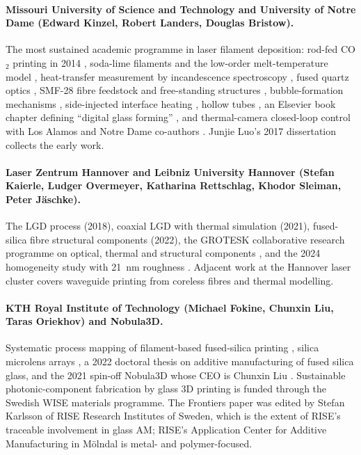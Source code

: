 \paragraph{Missouri University of Science and Technology and University of Notre Dame (Edward Kinzel, Robert Landers, Douglas Bristow).} The most sustained academic programme in laser filament deposition: rod-fed CO$_2$ printing in 2014 \citep{luo2014jmse}, soda-lime filaments and the low-order melt-temperature model \citep{luo2017sodalime}, heat-transfer measurement by incandescence spectroscopy \citep{luo2017heat}, fused quartz optics \citep{luo2018quartz,luo2016spie}, SMF-28 fibre feedstock and free-standing structures \citep{hostetler2018fiber,hostetler2018sff,hostetler2019optics}, bubble-formation mechanisms \citep{bubbles2018}, side-injected interface heating \citep{capps2021interface}, hollow tubes \citep{dgf2023tubes}, an Elsevier book chapter defining ``digital glass forming'' \citep{kinzel2025dgf}, and thermal-camera closed-loop control with Los Alamos and Notre Dame co-authors \citep{dgf2026control}. Junjie Luo's 2017 dissertation collects the early work.

\paragraph{Laser Zentrum Hannover and Leibniz University Hannover (Stefan Kaierle, Ludger Overmeyer, Katharina Rettschlag, Khodor Sleiman, Peter J{\"a}schke).} The LGD process (2018), coaxial LGD with thermal simulation (2021), fused-silica fibre structural components (2022), the GROTESK collaborative research programme on optical, thermal and structural components \citep{grotesk2022}, and the 2024 homogeneity study with \SI{21}{nm} roughness \citep{witzendorff2018,lgd2021coaxial,lgd2022fibers,lgd2024homog}. Adjacent work at the Hannover laser cluster covers waveguide printing from coreless fibres and thermal modelling.

\paragraph{KTH Royal Institute of Technology (Michael Fokine, Chunxin Liu, Taras Oriekhov) and Nobula3D.} Systematic process mapping of filament-based fused-silica printing \citep{kth2022bonding}, silica microlens arrays \citep{kth2024microlens}, a 2022 doctoral thesis on additive manufacturing of fused silica glass, and the 2021 spin-off Nobula3D whose CEO is Chunxin Liu \citep{nobula_kthventures,nobula_fabbaloo}. Sustainable photonic-component fabrication by glass 3D printing is funded through the Swedish WISE materials programme. The Frontiers paper was edited by Stefan Karlsson of RISE Research Institutes of Sweden, which is the extent of RISE's traceable involvement in glass AM; RISE's Application Center for Additive Manufacturing in M{\"o}lndal is metal- and polymer-focused.

